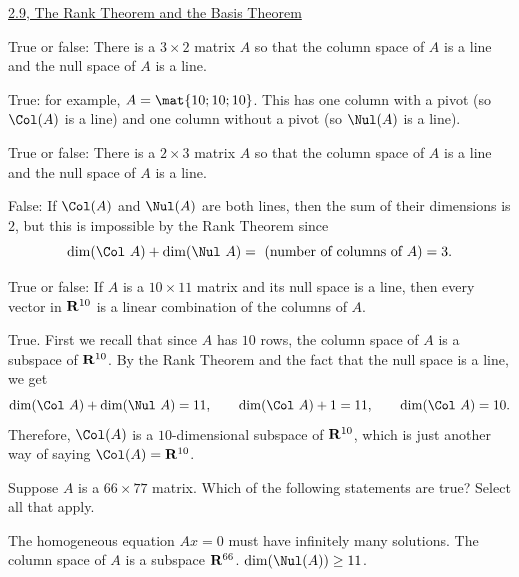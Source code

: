 \newpage





\begin{center} \underline{2.9, The Rank Theorem and the Basis
    Theorem} \end{center}

\begin{problems}
\problem %
  True or false: There is a $3 \times 2$ matrix $A$ so that the column space of
  $A$ is a line and the null space of $A$ is a line.
  
\begin{solution}
  True: for example, $A = \mat{1 0; 1 0; 1 0}$.  This has one column with a
  pivot (so $\Col(A)$ is a line) and one column without a pivot (so $\Nul(A)$ is
  a line).
\end{solution}

\problem %
True or false: There is a $2 \times 3$ matrix $A$ so that the column space of
$A$ is a line and the null space of $A$ is a line. %

\begin{solution}
  False: If $\Col(A)$ and $\Nul(A)$ are both lines, then the sum of their
  dimensions is $2$, but this is impossible by the Rank Theorem since
\[\dim(\Col \ A) + \dim(\Nul \ A) = \ \textup{(number of columns of $A$)} = 3.\]
\end{solution}

\problem %
True or false: If $A$ is a
$10 \times 11$ matrix and its null space is a line, then every vector
in ${\bf R}^{10}$ is a linear combination of the columns of $A$.

\begin{solution}
  True.  First we recall that since $A$ has $10$ rows, the column
  space of $A$ is a subspace of ${\bf R}^{10}$. By the Rank Theorem
  and the fact that the null space is a line, we get
  \[\dim(\Col \ A) + \dim(\Nul \ A) = 11, \qquad
    \dim(\Col \ A) + 1 = 11, \qquad
    \dim(\Col \ A) = 10.\]
  Therefore, $\Col(A)$ is a $10$-dimensional subspace of ${\bf R}^{10}$,
  which is just another way of saying $\Col(A) = {\bf R}^{10}$.
\end{solution}

\problem %
Suppose $A$ is a $66 \times 77$ matrix.  Which of the following statements are true?  Select all that apply.
\begin{subproblems}
  \subproblem The homogeneous equation $Ax=0$ must have infinitely
  many solutions.
  \subproblem The column space of $A$ is a subspace ${\bf R}^{66}$.
  \subproblem $\dim(\Nul(A)) \geq 11$.
\end{subproblems}


\end{problems}
